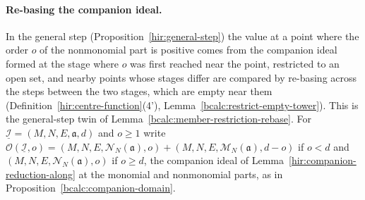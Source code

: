 \paragraph{Re-basing the companion ideal.} In the general step (Proposition~\ref{hir:general-step}) the value at a point where the order \(o\) of the
nonmonomial part is positive comes from the companion ideal formed at the stage where \(o\) was first reached near the point, restricted to an open set, and
nearby points whose stages differ are compared by re-basing across the steps between the two stages, which are empty near them
(Definition~\ref{hir:centre-function}(4'), Lemma~\ref{bcalc:restrict-empty-tower}). This is the general-step twin of Lemma~\ref{bcalc:member-restriction-rebase}.
For \(\underline{\mathcal I}=(M,N,E,\mathfrak a,d)\) and \(o\ge1\) write
\(\mathcal O(\underline{\mathcal I},o)=(M,N,E,\mathcal N_N(\mathfrak a),o)+(M,N,E,\mathcal M_N(\mathfrak a),d-o)\) if \(o<d\) and \((M,N,E,\mathcal N_N(\mathfrak a),o)\) if \(o\ge d\),
the companion ideal of Lemma~\ref{hir:companion-reduction-along} at the monomial and nonmonomial parts, as in Proposition~\ref{bcalc:companion-domain}.

